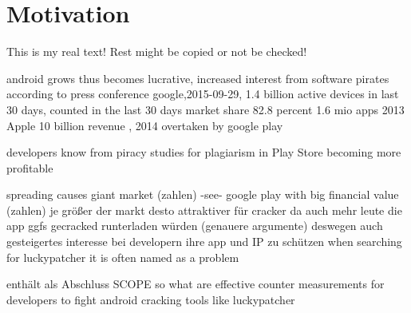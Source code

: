 \section{Motivation}\label{section:introduction-motivation}
This is my real text! Rest might be copied or not be checked!

%
android grows thus becomes lucrative, increased interest from software pirates
according to press conference google,2015-09-29, 1.4 billion active devices in last 30 days, counted in the last 30 days\cite{androidDevices}
market share 82.8 percent \cite{androidShare}
1.6 mio apps \cite{statistaAppStore}
2013 Apple 10 billion revenue \cite{statistaRevenue}, 2014 overtaken by google play \cite{wiwoValue}

developers know from piracy\cite{developersPiracy}
studies for plagiarism in Play Store \cite{bitdefenderPlagiarism}
becoming more profitable \cite{businessProfit}

%


spreading causes giant market (zahlen) -see- google play with big financial value (zahlen)\newline
je größer der markt desto attraktiver für cracker da auch mehr leute die app ggfs gecracked runterladen würden (genauere argumente)\newline
deswegen auch gesteigertes interesse bei developern ihre app und IP zu schützen\newline
when searching for luckypatcher it is often named as a problem

enthält als Abschluss SCOPE\newline
so what are effective counter measurements for developers to fight android cracking tools like luckypatcher
